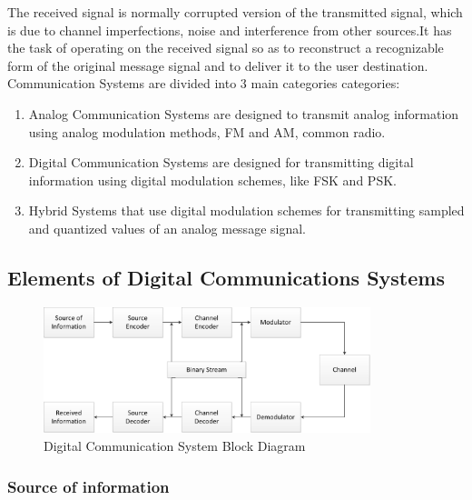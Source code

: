 The received signal is normally corrupted version of the transmitted signal,
which is due to channel imperfections, noise and interference from other
sources.It has the task of operating on the received signal so as to reconstruct
a recognizable form of the original message signal and to deliver it to the user
destination.\\

Communication Systems are divided into 3 main categories categories:

\begin{enumerate}

  \item Analog Communication Systems are designed to transmit analog information
  using analog modulation methods, FM and AM, common radio.

  \item Digital Communication Systems are designed for transmitting digital
  information using digital modulation schemes, like FSK and PSK.

  \item Hybrid Systems that use digital modulation schemes for transmitting
  sampled and quantized values of an analog message signal.

\end{enumerate}

\subsection{Elements of Digital Communications Systems}

\begin{figure}[htbp]
    \centering
    \includegraphics[width=0.85\textwidth]{./figures/digicom_bd}
    \caption{ Digital Communication System Block Diagram
    \label{fig:digcombd}}
\end{figure}

\subsubsection{Source of information}

